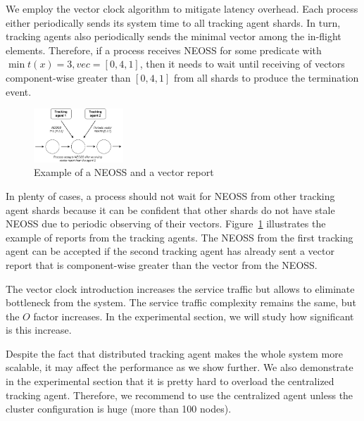 We employ the vector clock algorithm to mitigate latency overhead. Each process either periodically sends its system time to all tracking agent shards. In turn, tracking agents also periodically sends the minimal vector among the in-flight elements. Therefore, if a process receives NEOSS for some predicate with $\min t(x) = 3, vec=[0,4,1]$, then it needs to wait until receiving of vectors component-wise greater than $[0,4,1]$ from all shards to produce the termination event.

\begin{figure}[t]
  \centering
  \includegraphics[width=0.3\textwidth]{pics/distributed-tracker.pdf}
  \caption{Example of a NEOSS and a vector report}
  \label{fig:distributed-tracker}
\end{figure}

In plenty of cases, a process should not wait for NEOSS from other tracking agent shards because it can be confident that other shards do not have stale NEOSS due to periodic observing of their vectors. Figure~\ref{fig:distributed-tracker} illustrates the example of reports from the tracking agents. The NEOSS from the first tracking agent can be accepted if the second tracking agent has already sent a vector report that is component-wise greater than the vector from the NEOSS.

The vector clock introduction increases the service traffic but allows to eliminate bottleneck from the system. The service traffic complexity remains the same, but the $O$ factor increases. In the experimental section, we will study how significant is this increase.

Despite the fact that distributed tracking agent makes the whole system more scalable, it may affect the performance as we show further. We also demonstrate in the experimental section that it is pretty hard to overload the centralized tracking agent. Therefore, we recommend to use the centralized agent unless the cluster configuration is huge (more than 100 nodes).
